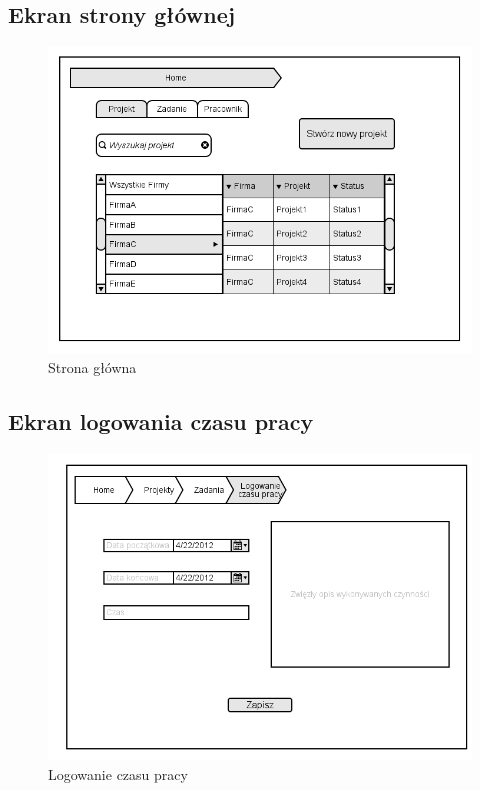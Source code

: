 \subsection{Ekran strony głównej}
\begin{figure}[H]
    \centering
    \includegraphics[scale=0.7]{diagramy/intefejsy/Home.png}
    \caption{Strona główna}
    \label{fig:usecase}
\end{figure}

\subsection{Ekran logowania czasu pracy}
\begin{figure}[H]
    \centering
    \includegraphics[scale=0.7]{diagramy/intefejsy/Logowanie_czasu_pracy.png}
    \caption{Logowanie czasu pracy}
    \label{fig:usecase}
\end{figure}

